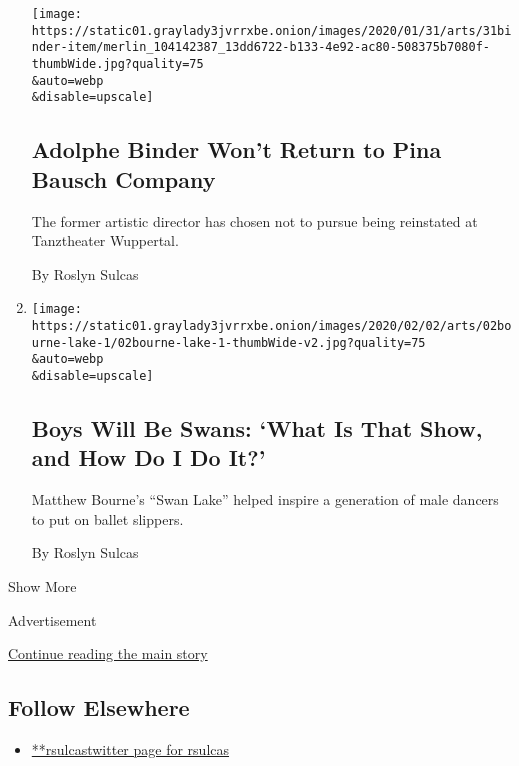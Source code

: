 \begin{enumerate}
  \texttt{[image: https://static01.graylady3jvrrxbe.onion/images/2020/01/31/arts/31binder-item/merlin\_104142387\_13dd6722-b133-4e92-ac80-508375b7080f-thumbWide.jpg?quality=75\\\&auto=webp\\\&disable=upscale]}

  \hypertarget{adolphe-binder-wont-return-to-pina-bausch-company}{%
  \subsection{Adolphe Binder Won't Return to Pina Bausch
  Company}\label{adolphe-binder-wont-return-to-pina-bausch-company}}

  The former artistic director has chosen not to pursue being reinstated
  at Tanztheater Wuppertal.

  By Roslyn Sulcas
\item
  \href{/2020/01/30/arts/dance/matthew-bourne-swan-lake.html}{}

  \texttt{[image: https://static01.graylady3jvrrxbe.onion/images/2020/02/02/arts/02bourne-lake-1/02bourne-lake-1-thumbWide-v2.jpg?quality=75\\\&auto=webp\\\&disable=upscale]}

  \hypertarget{boys-will-be-swans-what-is-that-show-and-how-do-i-do-it}{%
  \subsection{Boys Will Be Swans: `What Is That Show, and How Do I Do
  It?'}\label{boys-will-be-swans-what-is-that-show-and-how-do-i-do-it}}

  Matthew Bourne's ``Swan Lake'' helped inspire a generation of male
  dancers to put on ballet slippers.

  By Roslyn Sulcas
\end{enumerate}

Show More

Advertisement

\protect\hyperlink{after-mid2}{Continue reading the main story}

\hypertarget{follow-elsewhere}{%
\subsection{Follow Elsewhere}\label{follow-elsewhere}}

\begin{itemize}
\tightlist
\item
  \href{https://twitter.com/rsulcas}{**rsulcastwitter page for rsulcas}
\end{itemize}

